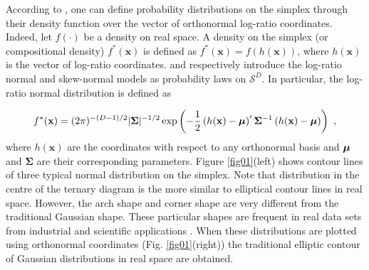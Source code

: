 \documentclass[preprint, review, 3p, authoryear]{elsarticle}
\begin{document}

According to \cite{mateu2013normal}, one can define probability distributions on the simplex through their density function over the vector of orthonormal log-ratio coordinates. Indeed, let $f(\cdot)$ be a density on real space. A density on the simplex (or compositional density) $f^*(\mathbf{x})$ is defined as $f^*(\mathbf{x})=f(h(\mathbf{x}))$, where $h(\mathbf{x})$ is the vector of log-ratio coordinates. \cite{mateu2013normal} and \cite{ mateu2007skew} respectively introduce the log-ratio normal and skew-normal models as probability laws on $\mathcal{S}^D$. In particular, the log-ratio normal distribution is defined as

\begin{equation}\label{eq:densSNormal}
f^{*}(\mathbf{x}) =(2\pi)^{-(D-1)/2} |\mathbf{\Sigma}|^{-1/2} \exp \left( -{\frac{1}{2}} \left(h(\mathbf{x})- \mbox{\boldmath \(\mu\)} \right)' \mathbf{\Sigma}^{-1} \left( h(\mathbf{x})- \mbox{\boldmath\(\mu\)} \right)\right)\ ,
\end{equation}
where $h(\mathbf{x})$ are the coordinates with respect to any orthonormal basis and $\mbox{\boldmath \(\mu\)}$ and $\mathbf{\Sigma}$ are their corresponding parameters. Figure \ref{fig01}(left) shows  contour lines of three typical normal distribution on the simplex. Note that distribution in the centre of the ternary diagram is the more similar to elliptical contour lines in real space. However, the arch shape and corner shape are very different from the traditional Gaussian shape. These particular shapes are frequent in real data sets from industrial and scientific applications \citep{aitchison1986statistical, Buccianti11}.
When these distributions are plotted using orthonormal coordinates (Fig. \ref{fig01}(right)) the traditional elliptic contour of
Gaussian distributions in real space are obtained.
\end{document}
